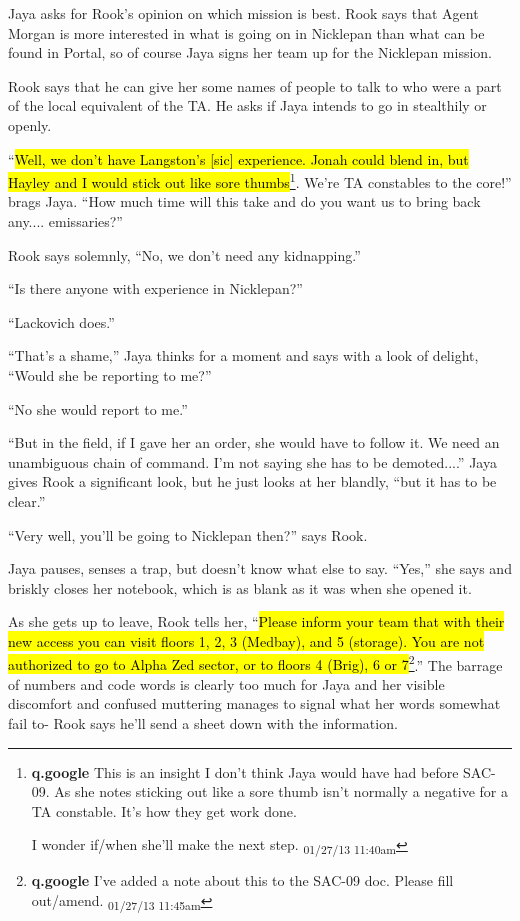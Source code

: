 Jaya asks for Rook's opinion on which mission is best.  Rook says that Agent Morgan is more interested in what is going on in Nicklepan than what can be found in Portal, so of course Jaya signs her team up for the Nicklepan mission.



Rook says that he can give her some names of people to talk to who were a part of the local equivalent of the TA.  He asks if Jaya intends to go in stealthily or openly.  



``\hl{Well, we don't have Langston's {[}sic{]} experience.  Jonah could blend in, but Hayley and I would stick out like sore thumbs}\footnote{\textbf{q.google }This is an insight I don't think Jaya would have had before SAC-09.  As she notes sticking out like a sore thumb isn't normally a negative for a TA constable.  It's how they get work done.

I wonder if/when she'll make the next step. \textsubscript{01/27/13 11:40am}}.  We're TA constables to the core!''  brags Jaya.  ``How much time will this take and do you want us to bring back any.... emissaries?''

Rook says solemnly, ``No, we don't need any kidnapping.''

``Is there anyone with experience in Nicklepan?''

``Lackovich does.''

``That's a shame,'' Jaya thinks for a moment and says with a look of delight, ``Would she be reporting to me?''

``No she would report to me.''

``But in the field, if I gave her an order, she would have to follow it.  We need an unambiguous chain of command.  I'm not saying she has to be demoted....'' Jaya gives Rook a significant look, but he just looks at her blandly, ``but it has to be clear.''

``Very well, you'll be going to Nicklepan then?'' says Rook.



Jaya pauses, senses a trap, but doesn't know what else to say.  ``Yes,'' she says and briskly closes her notebook, which is as blank as it was when she opened it.



As she gets up to leave, Rook tells her, ``\hl{Please inform your team that with their new access you can visit floors 1, 2, 3 (Medbay), and 5 (storage).  You are not authorized to go to Alpha Zed sector, or to floors 4 (Brig), 6 or 7}\footnote{\textbf{q.google }I've added a note about this to the SAC-09 doc.  Please fill out/amend. \textsubscript{01/27/13 11:45am}}.''  The barrage of numbers and code words is clearly too much for Jaya and her visible discomfort and confused muttering manages to signal what her words somewhat fail to- Rook says he'll send a sheet down with the information.  


